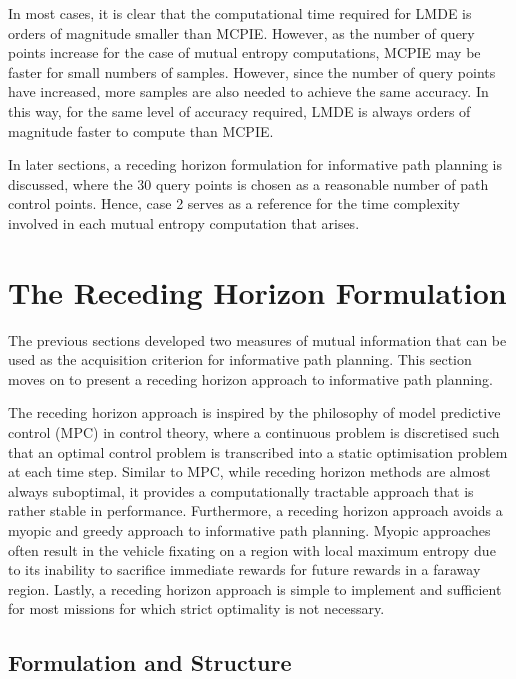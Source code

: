 		In most cases, it is clear that the computational time required for LMDE is orders of magnitude smaller than MCPIE. However, as the number of query points increase for the case of mutual entropy computations, MCPIE may be faster for small numbers of samples. However, since the number of query points have increased, more samples are also needed to achieve the same accuracy. In this way, for the same level of accuracy required, LMDE is always orders of magnitude faster to compute than MCPIE.
		
		In later sections, a receding horizon formulation for informative path planning is discussed, where the 30 query points is chosen as a reasonable number of path control points. Hence, case 2 serves as a reference for the time complexity involved in each mutual entropy computation that arises.

	\section{The Receding Horizon Formulation}
	\label{InformativeSeafloorExploration:RecedingHorizonFormulation}
	
		The previous sections developed two measures of mutual information that can be used as the acquisition criterion for informative path planning. This section moves on to present a receding horizon approach to informative path planning.
		
		The receding horizon approach is inspired by the philosophy of model predictive control (MPC) in control theory, where a continuous problem is discretised such that an optimal control problem is transcribed into a static optimisation problem at each time step. Similar to MPC, while receding horizon methods are almost always suboptimal, it provides a computationally tractable approach that is rather stable in performance. Furthermore, a receding horizon approach avoids a myopic and greedy approach to informative path planning. Myopic approaches often result in the vehicle fixating on a region with local maximum entropy due to its inability to sacrifice immediate rewards for future rewards in a faraway region. Lastly, a receding horizon approach is simple to implement and sufficient for most missions for which strict optimality is not necessary.
		
		\subsection{Formulation and Structure}
		\label{InformativeSeafloorExploration:RecedingHorizonFormulation:Structure}
		
